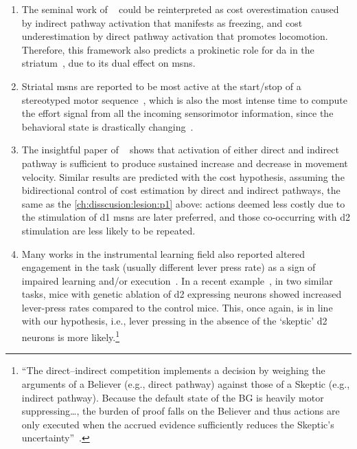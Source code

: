 \begin{enumerate}[noitemsep, label=\Roman*.]
    \item \label{ch:disscusion:lesion:p1} The seminal work of \citeauthor{Kravitz2010Nature}~\cite{Kravitz2010Nature} could be reinterpreted as cost overestimation caused by indirect pathway activation that manifests as freezing, and cost underestimation by direct pathway activation that promotes locomotion.
    Therefore, this framework also predicts a prokinetic role for \gls{da} in the striatum~\cite{Howe2016N}, due to its dual effect on \glspl{msn}.
    \item Striatal \glspl{msn} are reported to be most active at the start/stop of a stereotyped motor sequence~\cite{Barnes2005Nature, Jin2014NN}, which is also the most intense time to compute the effort signal from all the incoming sensorimotor information, since the behavioral state is drastically changing~\cite{Sales-Carbonell2018, Robbe2018}.
    \item The insightful paper of ~\cite{Yttri2016Nature} shows that activation of either direct and indirect pathway is sufficient to produce sustained increase and decrease in movement velocity.
    Similar results are predicted with the cost hypothesis, assuming the bidirectional control of cost estimation by direct and indirect pathways, the same as the \autoref{ch:disscusion:lesion:p1} above:
    actions deemed less costly due to the stimulation of \gls{d1} \glspl{msn} are later preferred, and those co-occurring with \gls{d2} stimulation are less likely to be repeated.
    \item Many works in the instrumental learning field also reported altered engagement in the task (usually different lever press rate) as a sign of impaired learning and/or execution~\cite{Hart2018CurrBiol}.
    In a recent example~\cite{Matamales2020Sci}, in two similar tasks, mice with genetic ablation of \gls{d2} expressing neurons showed increased lever-press rates compared to the control mice.
    This, once again, is in line with our hypothesis, i.e., lever pressing in the absence of the `skeptic' \gls{d2} neurons is more likely.\footnote{
        ``The direct–indirect competition implements a decision by weighing the arguments of a Believer (e.g., direct pathway) against those of a Skeptic (e.g., indirect pathway).
        Because the default state of the BG is heavily motor suppressing\ldots, the burden of proof falls on the Believer and thus actions are only executed when the accrued evidence sufficiently reduces the Skeptic’s uncertainty''~\cite{Dunovan2016FrontNeurosci}.
    }
\end{enumerate}
